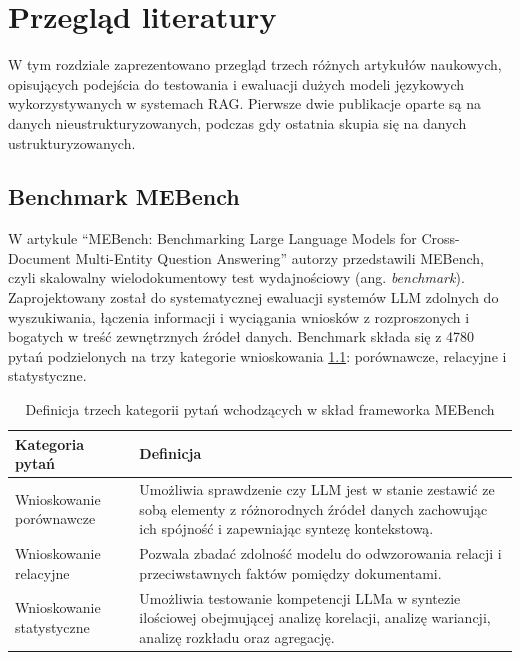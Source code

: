 \cleardoublepage

\chapter{Przegląd literatury}
W tym rozdziale zaprezentowano przegląd trzech różnych artykułów naukowych, opisujących podejścia do testowania i ewaluacji dużych modeli językowych wykorzystywanych w systemach RAG. Pierwsze dwie publikacje oparte są na danych nieustrukturyzowanych, podczas gdy ostatnia skupia się na danych ustrukturyzowanych.
    

    \section{Benchmark MEBench}
    W artykule \enquote{MEBench: Benchmarking Large Language Models for Cross-Document Multi-Entity Question Answering} \cite{art1_2025} autorzy przedstawili MEBench, czyli skalowalny wielodokumentowy test wydajnościowy (ang. \textit{benchmark}). Zaprojektowany został do systematycznej ewaluacji systemów LLM zdolnych do wyszukiwania, łączenia informacji i wyciągania wniosków z rozproszonych i bogatych w treść zewnętrznych źródeł danych. Benchmark składa się z 4780 pytań podzielonych na trzy kategorie wnioskowania \ref{mebench_kategorie_pytan}: porównawcze, relacyjne i statystyczne. 

    \begin{table}[h]
        \centering
        \caption{ Definicja trzech kategorii pytań wchodzących w skład frameworka MEBench }
        \begin{tabularx}{\textwidth}{|p{5cm}|X|}
        \hline
        \textbf{Kategoria pytań} & \textbf{Definicja} \\
        \hline
        Wnioskowanie porównawcze & Umożliwia sprawdzenie czy LLM jest w stanie zestawić ze sobą elementy z różnorodnych źródeł danych zachowując ich spójność i zapewniając syntezę kontekstową.  \\ \hline
        
        Wnioskowanie relacyjne & Pozwala zbadać zdolność modelu do odwzorowania relacji i przeciwstawnych faktów pomiędzy dokumentami.  \\ \hline
        
        Wnioskowanie statystyczne & Umożliwia testowanie kompetencji LLMa w syntezie ilościowej obejmującej analizę korelacji, analizę wariancji, analizę rozkładu oraz agregację. \\ \hline
        \end{tabularx}
        \label{mebench_kategorie_pytan}
    \end{table}
    
